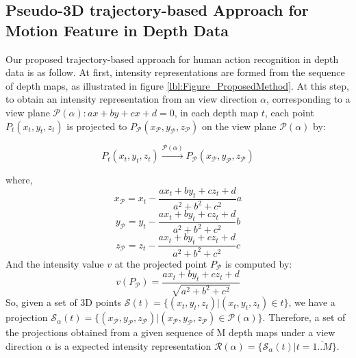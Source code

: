 \documentclass[review]{elsarticle}
\begin{document}
\subsection{Pseudo-3D trajectory-based Approach for Motion Feature in Depth Data}

Our proposed trajectory-based approach for human action recognition in depth data is as follow. At first, intensity representations are formed from the sequence of depth maps, as illustrated in figure \ref{lbl:Figure_ProposedMethod}. At this step, to obtain an intensity representation from an view direction $\alpha$, corresponding to a view plane $\mathcal{P}(\alpha): ax + by + cx + d = 0$, in each depth map $t$, each point $P_t(x_t,y_t,z_t)$ is projected to $P_\mathcal{P}(x_\mathcal{P},y_\mathcal{P},z_\mathcal{P})$ on the view plane $\mathcal{P}(\alpha)$ by:

\begin{equation}
	P_t(x_t,y_t,z_t)\xrightarrow{\mathcal{P}(\alpha)}P_\mathcal{P}(x_\mathcal{P},y_\mathcal{P},z_\mathcal{P})
\end{equation}

where,
\begin{equation}
	x_\mathcal{P} = x_t - \frac{ax_t + by_t + cz_t + d}{a^2 + b^2 + c^2}a
\end{equation}
\begin{equation}
	y_\mathcal{P} = y_t - \frac{ax_t + by_t + cz_t + d}{a^2 + b^2 + c^2}b
\end{equation}
\begin{equation}
	z_\mathcal{P} = z_t - \frac{ax_t + by_t + cz_t + d}{a^2 + b^2 + c^2}c
\end{equation}
And the intensity value $v$ at the projected point $P_\mathcal{P}$ is computed by:
\begin{equation}
	v(P_\mathcal{P}) = \frac{ax_t + by_t + cz_t + d}{\sqrt{a^2 + b^2 + c^2}}
\end{equation}
So, given a set of 3D points $\mathcal{S}(t) = \{(x_t,y_t,z_t)\vert(x_t,y_t,z_t) \in t\}$, we have a projection $\mathcal{S}_\alpha(t) = \{(x_\mathcal{P},y_\mathcal{P},z_\mathcal{P})\vert(x_\mathcal{P},y_\mathcal{P},z_\mathcal{P}) \in \mathcal{P}(\alpha)\}$. Therefore, a set of the projections obtained from a given sequence of M depth maps under a view direction $\alpha$ is a expected intensity representation $\mathcal{R}(\alpha) = \{\mathcal{S}_\alpha(t) \vert t=\overline{1..M}\}$.
\end{document}

